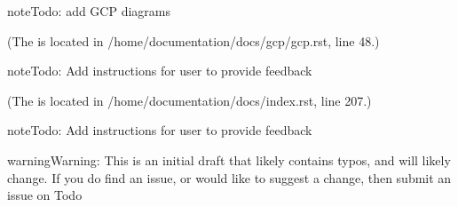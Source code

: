 \documentclass[letterpaper,10pt,english]{sphinxmanual}
\begin{document}
\begin{sphinxadmonition}{note}{Todo:}
add GCP diagrams
\end{sphinxadmonition}

(The {\hyperref[\detokenize{gcp/gcp:id1}]{}} is located in /home/documentation/docs/gcp/gcp.rst, line 48.)

\begin{sphinxadmonition}{note}{Todo:}
Add instructions for user to provide feedback
\end{sphinxadmonition}

(The {\hyperref[\detokenize{index:id1}]{}} is located in /home/documentation/docs/index.rst, line 207.)

\begin{sphinxadmonition}{note}{\label{\detokenize{index:id1}}Todo:}
Add instructions for user to provide feedback
\end{sphinxadmonition}

\begin{sphinxadmonition}{warning}{Warning:}
This is an initial draft that likely contains typos, and will likely change.
If you do find an issue, or would like to suggest a change, then submit an issue on Todo
\end{sphinxadmonition}



\renewcommand{\indexname}{Index}
\printindex
\end{document}
